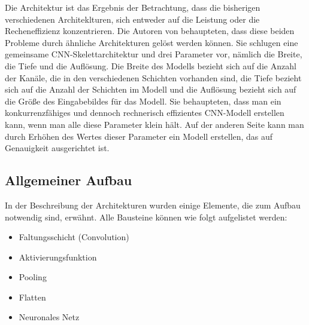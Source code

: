 Die Architektur ist das Ergebnis der Betrachtung, dass die bisherigen verschiedenen Architeklturen, sich entweder auf die Leistung oder die Recheneffizienz konzentrieren. Die Autoren von \cite{Tan:2020} behaupteten, dass diese beiden Probleme durch ähnliche Architekturen gelöst werden können. Sie schlugen eine gemeinsame CNN-Skelettarchitektur und drei Parameter vor, nämlich die Breite, die Tiefe und die Auflösung. Die Breite des Modells bezieht sich auf die Anzahl der Kanäle, die in den verschiedenen Schichten vorhanden sind, die Tiefe bezieht sich auf die Anzahl der Schichten im Modell und die Auflösung bezieht sich auf die Größe des Eingabebildes für das Modell. Sie behaupteten, dass man ein konkurrenzfähiges und dennoch rechnerisch effizientes CNN-Modell erstellen kann, wenn man alle diese Parameter klein hält. Auf der anderen Seite kann man durch Erhöhen des Wertes dieser Parameter ein Modell erstellen, das auf Genauigkeit ausgerichtet ist.

%

\subsection{Allgemeiner Aufbau}



In der Beschreibung der Architekturen wurden einige Elemente, die zum Aufbau notwendig sind, erwähnt. Alle Bausteine können wie folgt aufgelistet werden:

\begin{itemize}
  \item Faltungsschicht (Convolution)
  \item Aktivierungsfunktion
  \item Pooling
  \item Flatten
  \item Neuronales Netz
\end{itemize}

